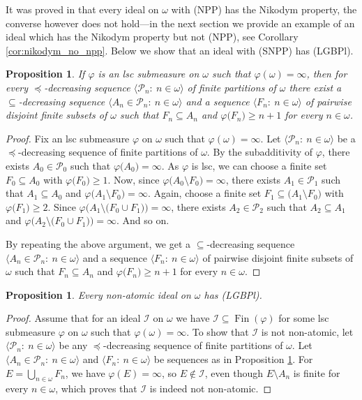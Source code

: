 \documentclass[a4paper,11pt,fleqn]{amsart}
\newtheorem{proposition}[theorem]{Proposition}
\theoremstyle{definition}
\theoremstyle{remark}
\numberwithin{equation}{section}
\newcommand{\N}{\mathbb{N}}
\newcommand{\iI}{\mathcal{I}}
\newcommand{\pP}{\mathcal{P}}
\DeclareMathOperator{\fin}{Fin}
\newcommand{\sm}{\setminus}
\newcommand{\sub}{\subseteq}
\newcommand{\seqn}[1]{\big\langle#1\colon\ n\io\big\rangle}
\newcommand{\io}{\in\omega}%
\begin{document}
It was proved in \cite{Stu07} that every ideal on $\omega$ with (NPP) has the Nikodym property, the converse however does not hold---in the next section we provide an example of an ideal which has the Nikodym property but not (NPP), see Corollary \ref{cor:nikodym_no_npp}. Below we show that an ideal with (SNPP) has (LGBPl).%

\begin{proposition}\label{prop:inf_submeas_partition_scheme}
If $\varphi$ is an lsc submeasure on $\omega$ such that $\varphi(\omega)=\infty$, then for every $\preceq$-decreasing sequence $\seqn{\pP_n}$ of finite partitions of $\omega$ there exist a $\subseteq$-decreasing sequence $\seqn{A_n\in\pP_n}$ and a sequence $\seqn{F_n}$ of pairwise disjoint finite subsets of $\omega$ such that $F_n\sub A_n$ and $\varphi\big(F_n\big)\geq n+1$ for every $n\io$.
\end{proposition}
\begin{proof}
Fix an lsc submeasure $\varphi$ on $\omega$ such that $\varphi(\omega)=\infty$. Let $\seqn{\pP_n}$ be a $\preceq$-decreasing sequence of finite partitions of $\omega$. By the subadditivity of $\varphi$, there exists $A_0\in\pP_0$ such that $\varphi\big(A_0\big)=\infty$. As $\varphi$ is lsc, we can choose a finite set $F_0\sub A_0$ with $\varphi\big(F_0\big)\geq 1$. Now, since $\varphi\big(A_0\setminus F_0\big)=\infty$, there exists $A_1\in\pP_1$ such that $A_1\sub A_0$ and $\varphi\big(A_1\setminus F_0\big)=\infty$. Again, choose a finite set $F_1\sub\big(A_1\setminus F_0\big)$ with $\varphi\big(F_1\big)\geq 2$. Since $\varphi\big(A_1\setminus\big(F_0\cup F_1\big)\big)=\infty$, there exists $A_2\in\pP_2$ such that $A_2\sub A_1$ and $\varphi\big(A_2\setminus\big(F_0\cup F_1\big)\big)=\infty$. And so on.

By repeating the above argument, we get a $\subseteq$-decreasing sequence $\seqn{A_n\in\pP_n}$ and a sequence $\seqn{F_n}$ of pairwise disjoint finite subsets of $\omega$ such that $F_n\sub A_n$ and $\varphi\big(F_n\big)\geq n+1$ for every $n\io$.
\end{proof}

\begin{proposition}\label{prop:nonatomic_lgbps}
    Every non-atomic ideal on $\omega$ has (LGBPl).
\end{proposition}
\begin{proof}
    Assume that for an ideal $\iI$ on $\omega$ we have $\iI\sub\fin(\varphi)$ for some lsc submeasure $\varphi$ on $\omega$ such that $\varphi(\omega)=\infty$. To show that $\iI$ is not non-atomic, let $\seqn{\pP_n}$ be any $\preceq$-decreasing sequence of finite partitions of $\omega$. Let $\seqn{A_n\in\pP_n}$ and $\seqn{F_n}$ be sequences as in Proposition \ref{prop:inf_submeas_partition_scheme}.
    For $E=\bigcup_{n\io} F_n$, we have $\varphi(E)=\infty$, so $E\notin\iI$, even though $E\sm A_n$ is finite for every $n\io$, which proves that $\iI$ is indeed not non-atomic.%
\end{proof}
\end{document}
